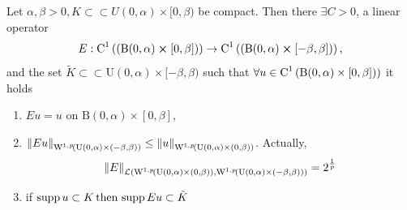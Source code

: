 \documentclass{article}
\begin{document}
\begin{lemma}
	Let $\alpha, \beta >0, K \subset \subset U(0,\alpha) \times [0,\beta)$ be compact. Then there $\exists C >0 $, a linear operator
	\[
		E:\text{C}^{1}\!\,\left((\text{B}(0,\alpha) \cross [0,\beta]) \right) \to \text{C}^{1}\!\,\left((\text{B}(0,\alpha) \cross [-\beta, \beta]) \right), 
	\]
	and the set $\tilde{K} \subset \subset \text{U}(0,\alpha) \times [-\beta, \beta)$ such that $\forall u \in \text{C}^{1}\!\,\left(\text{B}(0,\alpha) \times [0,\beta] \right))$ it holds
	\begin{enumerate}
		\item $Eu = u$ on $\text{B}(0,\alpha) \times [0,\beta]$,
		\item $\norm{Eu}_{\WkpSet[1][p]{\text{U}(0,\alpha) \times (-\beta,\beta)}} \leq \norm{u}_{\WkpSet[1][p]{\text{U}(0,\alpha) \times (0, \beta)}} $. Actually,
			\[
				\norm{E}_{\mathcal{L}\qty(\WkpSet[1][p]{\text{U}(0,\alpha)\times (0,\beta)},\WkpSet[1][p]{\text{U}(0,\alpha)\times(-\beta,\beta)})} = 2^{\frac{1}{p}}
			\]
		\item if $\operatorname{supp} u \subset K \, \text{then} \,\operatorname{supp} Eu \subset \tilde{K}$
	\end{enumerate}
\end{lemma}
\end{document}
